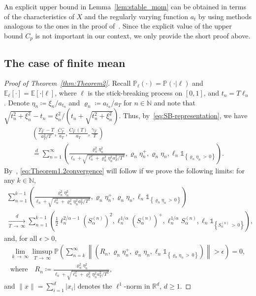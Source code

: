 \documentclass[AHL,Unicode,longabstracts,published]{cedram}
\newcommand\N{\mathbb{N}}
\newcommand\R{\mathbb{R}}
\newcommand\E{\mathds{E}}
\newcommand\p{\mathds{P}}
\newcommand\1{\mathds{1}}
\newcommand\eqd{\overset{d}{=}}
\newcommand\ov[1]{\overline{#1}}
\begin{document}
\begin{rema}
An explicit upper bound in Lemma~\ref{lem:stable_mom} can be obtained in terms of the characteristics of $X$ and the regularly varying function $a_t$ by using methods analogous to the ones in the proof of~\cite[Lemma~2]{LevySupSim}. Since the explicit value of the upper bound $C_p$ is not important in our context, we only provide the short proof above.
\end{rema}

\subsection{The case of finite mean}

\begin{proof}[Proof of Theorem~\ref{thm:Theorem2}]
Recall $\p_\ell(\cdot)=\p(\cdot|\ell)$ and $\E_\ell[\cdot]=\E[\cdot|\ell]$, where $\ell$ is the stick-breaking process on $[0,1]$, and $t_n=T\ell_n$. Denote $\eta_n\coloneqq\xi_n/a_{t_n}$ and $\varrho_n\coloneqq a_{t_n}/a_T$ for $n\in\N$ and note that $\sqrt{t_n^2+\xi_{n}^2}-t_n =\xi_{n}^2/(t_n+\sqrt{t_n^2+\xi_{n}^2})$. Thus, by~\eqref{eq:SB-representation}, we have
\begin{multline*}
\left(
\frac{\Upsilon_T^\frown-T}{a_T^2/T},
\frac{\ov C_T^\frown}{a_T},
\frac{C_T^\frown(T)}{a_T},
\frac{\gamma_T^\frown}{T}
\right)\\
\eqd
\sum_{n=1}^\infty\left(
\frac{\varrho_n^2\eta_n^2}{\ell_n+\sqrt{\ell_n^2+\varrho_n^2\eta_{n}^2a_T^2/T^2}},\varrho_n\eta_{n}^+,\varrho_n\eta_{n},
\ell_n\1_{\left\{\varrho_n\eta_{n}\,>\,0\right\}}
\right).
\end{multline*}
By~\cite[Theorem~3.2]{BillingsleyConvergence}, \eqref{eq:Theorem1.2convergence} will follow if we prove the following limits: for any $k\in\N$,
\begin{multline}\label{reducedconvergencestable}
\sum_{n=1}^{k-1}\left(
\frac{\varrho_n^2\eta_n^2}{\ell_n+\sqrt{\ell_n^2+\varrho_n^2\eta_{n}^2a_T^2/T^2}},\varrho_n\eta_{n}^+,\varrho_n\eta_{n},
\ell_n\1_{\left\{\varrho_n\eta_{n}\,>\,0\right\}}
\right) \\
\xrightarrow[T\,\to\,\infty]{d}
\sum_{n=1}^{k-1} \left(
\frac{1}{2}\ell_n^{2/\alpha-1}\left(S_\alpha^{(n)}\right)^2,
\ell_n^{1/\alpha} \left(S_\alpha^{(n)}\right)^+,
\ell_n^{1/\alpha} S_\alpha^{(n)},
\ell_n\1_{\left\{S_\alpha^{(n)}\,>\,0\right\}}
\right),
\end{multline}
and, for all $\epsilon>0$,
\begin{multline}\label{limreducedlimitstable}
\lim_{k\,\to\,\infty}\limsup_{T\,\to\,\infty}
\p\left(\sum_{n=k}^\infty\left\|\left(R_n,\varrho_n\eta_{n}^+,\varrho_n\eta_{n},
\ell_n\1_{\left\{\varrho_n\eta_{n}\,>\,0\right\}}
\right)\right\|>\epsilon\right) =0,\\
\text{where}\quad R_n\coloneqq\frac{\varrho_n^2\eta_n^2}{\ell_n+\sqrt{\ell_n^2+\varrho_n^2\eta_n^2a_T^2/T^2}},
\end{multline}
and $\|x\|=\sum_{i=1}^d |x_i|$ denotes the $\ell^1$-norm in $\R^d$, $d\ge 1$.


\end{proof}
\end{document}
